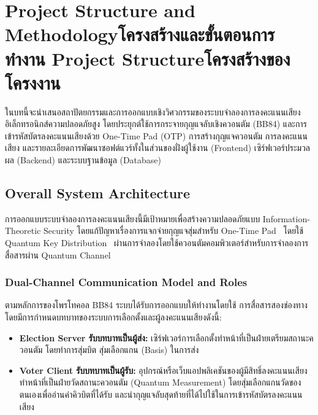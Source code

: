 \chapter{\ifproject%
\ifenglish Project Structure and Methodology\else โครงสร้างและขั้นตอนการทำงาน\fi
\else%
\ifenglish Project Structure\else โครงสร้างของโครงงาน\fi
\fi
}

ในบทนี้จะนำเสนอสถาปัตยกรรมและการออกแบบเชิงวิศวกรรมของระบบจำลองการลงคะแนนเสียงอิเล็กทรอนิกส์ความปลอดภัยสูง โดยประยุกต์ใช้การกระจายกุญแจลับเชิงควอนตัม (BB84) และการเข้ารหัสบัตรลงคะแนนเสียงด้วย One-Time Pad (OTP) การสร้างกุญแจควอนตัม การลงคะแนนเสียง และรายละเอียดการพัฒนาซอฟต์แวร์ทั้งในส่วนของฝั่งผู้ใช้งาน (Frontend) เซิร์ฟเวอร์ประมวลผล (Backend) และระบบฐานข้อมูล (Database)

\section{Overall System Architecture}
การออกแบบระบบจำลองการลงคะแนนเสียงนี้มีเป้าหมายเพื่อสร้างความปลอดภัยแบบ Information-Theoretic Security โดยแก้ปัญหาเรื่องการแจกจ่ายกุญแจสุ่มสำหรับ One-Time Pad~\cite{vernam_cipher, shannon_secure} โดยใช้ Quantum Key Distribution~\cite{bb84} ผ่านการจำลองโดยใช้ควอนตัมคอมพิวเตอร์สำหรับการจำลองการสื่อสารผ่าน Quantum Channel

\subsection{Dual-Channel Communication Model and Roles}
ตามหลักการของโพรโทคอล BB84 ระบบได้รับการออกแบบให้ทำงานโดยใช้ การสื่อสารสองช่องทาง โดยมีการกำหนดบทบาทของระบบการเลือกตั้งและผู้ลงคะแนนเสียงดังนี้:
\begin{itemize}
    \item \textbf{Election Server รับบทบาทเป็นผู้ส่ง:} เซิร์ฟเวอร์การเลือกตั้งทำหน้าที่เป็นฝ่ายเตรียมสถานะควอนตัม โดยทำการสุ่มบิต สุ่มเลือกแกน (Basis) ในการส่ง
    \item \textbf{Voter Client รับบทบาทเป็นผู้รับ:} อุปกรณ์หรือเว็บแอปพลิเคชันของผู้มีสิทธิ์ลงคะแนนเสียง ทำหน้าที่เป็นฝ่ายวัดสถานะควอนตัม (Quantum Measurement) โดยสุ่มเลือกแกนวัดของตนเองเพื่ออ่านค่าคิวบิตที่ได้รับ และนำกุญแจลับสุดท้ายที่ได้ไปใช้ในการเข้ารหัสบัตรลงคะแนนเสียง
\end{itemize}

